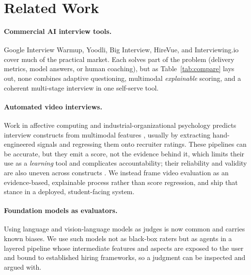 \documentclass[11pt]{article}
\begin{document}
\section{Related Work}
\label{sec:related}
\paragraph{Commercial AI interview tools.} Google Interview Warmup, Yoodli, Big Interview, HireVue, and Interviewing.io cover much of the practical market. Each solves part of the problem (delivery metrics, model answers, or human coaching), but as Table~\ref{tab:compare} lays out, none combines adaptive questioning, multimodal \emph{explainable} scoring, and a coherent multi-stage interview in one self-serve tool.

\paragraph{Automated video interviews.} Work in affective computing and industrial-organizational psychology predicts interview constructs from multimodal features \citep{naim2018automated,hemamou2019hirenet}, usually by extracting hand-engineered signals and regressing them onto recruiter ratings. These pipelines can be accurate, but they emit a score, not the evidence behind it, which limits their use as a \emph{learning} tool and complicates accountability; their reliability and validity are also uneven across constructs \citep{hickman2022automated}. We instead frame video evaluation as an evidence-based, explainable process rather than score regression, and ship that stance in a deployed, student-facing system.

\paragraph{Foundation models as evaluators.} Using language and vision-language models as judges is now common \citep{zheng2023judging} and carries known biases. We use such models not as black-box raters but as agents in a layered pipeline whose intermediate features and aspects are exposed to the user and bound to established hiring frameworks, so a judgment can be inspected and argued with.
\end{document}
